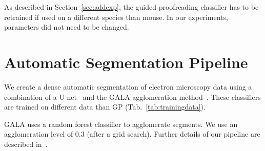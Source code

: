 As described in Section~\ref{sec:addexp}, the guided proofreading classifier has to be retrained if used on a different species than mouse. In our experiments, parameters did not need to be changed.

\section{Automatic Segmentation Pipeline}

We create a dense automatic segmentation of electron microscopy data using a combination of a U-net~\cite{RonnebergerFB15} and the GALA agglomeration method~\cite{nunez2014graph}. These classifiers are trained on different data than GP (Tab.~\ref{tab:trainingdata}).

\begin{table}[h]
\caption{Training data of membrane detection (U-Net / GALA) vs.~training data of GP vs.~test data.}%
\vspace{-1mm}
\label{tab:trainingdata}
\end{table}

GALA uses a random forest classifier to agglomerate segments. We use an agglomeration level of 0.3 (after a grid search). Further details of our pipeline are described in~\cite{rhoananet}.
